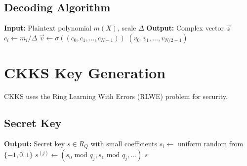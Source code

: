 \documentclass[11pt,a4paper]{article}
\newcommand{\bmod}{\text{ mod }}
\begin{document}
\subsection{Decoding Algorithm}

\begin{algorithm}[H]
\caption{CKKS Decoding}
\begin{algorithmic}[1]
    \State \textbf{Input:} Plaintext polynomial $m(X)$, scale $\Delta$
    \State \textbf{Output:} Complex vector $\vec{z}$
    \State
    \State {}
        \State $c_i \gets m_i / \Delta$
    \EndFor
    \State
    \State {}
    \State $\vec{v} \gets \sigma((c_0, c_1, \ldots, c_{N-1}))$
    \State
    \State {}
    \State \Return $(v_0, v_1, \ldots, v_{N/2-1})$
\EndFunction
\end{algorithmic}
\end{algorithm}

\section{CKKS Key Generation}

CKKS uses the Ring Learning With Errors (RLWE) problem for security.

\subsection{Secret Key}

\begin{algorithm}[H]
\caption{Secret Key Generation}
\begin{algorithmic}[1]
    \State \textbf{Output:} Secret key $s \in R_Q$ with small coefficients
    \State
        \State $s_i \gets$ uniform random from $\{-1, 0, 1\}$ 
    \EndFor
    \State
    \State {}
        \State $s^{(j)} \gets (s_0 \bmod q_j, s_1 \bmod q_j, \ldots)$
    \EndFor
    \State \Return $s$
\EndFunction
\end{algorithmic}
\end{algorithm}
\end{document}
